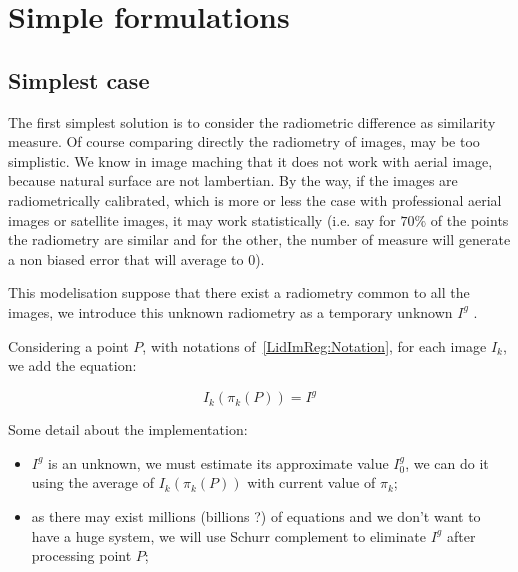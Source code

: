 
\section{Simple formulations}

\label{LIR:SimplF}


\subsection{Simplest case}

The first simplest solution is to consider the radiometric difference as
similarity measure.
Of course comparing directly the radiometry of images, may be too simplistic.
We know in image maching that it does not work with aerial image,  because natural
surface are not lambertian.   By the way, if the images
are radiometrically calibrated, which is more or less the case with professional
aerial images or satellite images, it may work statistically (i.e. say for $70\%$
of the points the radiometry are similar and for the other, the number of measure will
generate a non biased error that will average to $0$).


This modelisation suppose that there exist a radiometry 
common to all the images, we introduce this unknown radiometry as a 
temporary unknown $I^g$ .

Considering a point $P$, with notations of~\ref{LidImReg:Notation},
for each image $I_k$, we add  the equation:

\begin{equation}
    I_k(\pi_k(P)) = I^g \label{LIR:Eq1Point}
\end{equation}

Some detail about the implementation:

\begin{itemize}
    \item $I^g$ is an unknown, we must estimate its approximate value $I^g_0$,
          we can do it using the average of $I_k(\pi_k(P))$ with
          current value of $\pi_k$;

    \item as there may exist millions (billions ?) of equations and we don't
          want to have a huge system, we will use Schurr complement to eliminate
          $I^g$ after processing point $P$;
\end{itemize}


